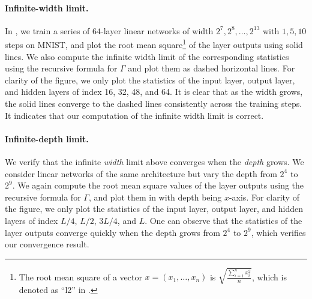 \documentclass{article}
\theoremstyle{plain}
\theoremstyle{definition}
\begin{document}
\paragraph{Infinite-width limit.} In , we train a series of $64$-layer linear networks of width $2^7, 2^8, \ldots, 2^{13}$ with $1, 5, 10$ steps on MNIST, and plot the root mean square\footnote{The root mean square of a vector $x=(x_1,\ldots, x_n)$ is $\sqrt{\frac{\sum_{i=1}^n x_i^2}{n}}$, which is denoted as ``l2'' in .} of the layer outputs using solid lines. We also compute the infinite width limit of the corresponding statistics using the recursive formula for $\Gamma$ and plot them as dashed horizontal lines. For clarity of the figure, we only plot the statistics of the input layer, output layer, and hidden layers of index 16, 32, 48, and 64. It is clear that as the width grows, the solid lines converge to the dashed lines consistently across the training steps. It indicates that our computation of the infinite width limit is correct.

\paragraph{Infinite-depth limit.} We verify that the infinite \emph{width} limit above converges when the \emph{depth} grows. We consider linear networks of the same architecture but vary the depth from $2^4$ to $2^9$. We again compute the root mean square values of the layer outputs using the recursive formula for $\Gamma$, and plot them in  with depth being $x$-axis. For clarity of the figure, we only plot the statistics of the input layer, output layer, and hidden layers of index $L/4$, $L/2$, $3L/4$, and $L$. One can observe that the statistics of the layer outputs converge quickly when the depth grows from $2^4$ to $2^9$, which verifies our convergence result.

    
\end{document}
